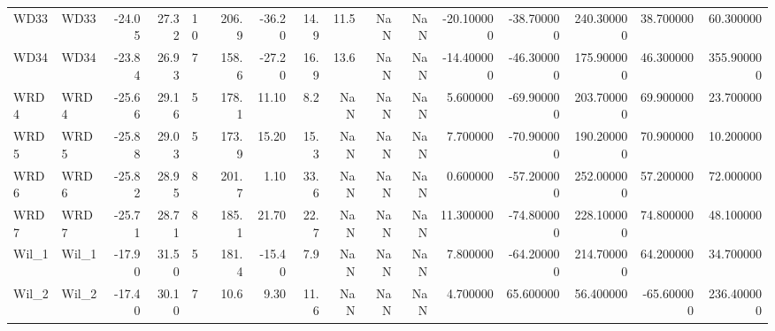 \documentclass{article}
\begin{document}
{\begin{tabular}{llrrlrrrrrrrrrrr}
WD33          &                     WD33 &    -24.05 &      27.32 &   10 &   206.9 &  -36.20 &  14.9 &   11.5 &     NaN &         NaN &     -20.100000 & -38.700000 &  240.300000 &     38.700000 &      60.300000 \\
WD34          &                     WD34 &    -23.84 &      26.93 &    7 &   158.6 &  -27.20 &  16.9 &   13.6 &     NaN &         NaN &     -14.400000 & -46.300000 &  175.900000 &     46.300000 &     355.900000 \\
WRD4          &                     WRD4 &    -25.66 &      29.16 &    5 &   178.1 &   11.10 &   8.2 &    NaN &     NaN &         NaN &       5.600000 & -69.900000 &  203.700000 &     69.900000 &      23.700000 \\
WRD5          &                     WRD5 &    -25.88 &      29.03 &    5 &   173.9 &   15.20 &  15.3 &    NaN &     NaN &         NaN &       7.700000 & -70.900000 &  190.200000 &     70.900000 &      10.200000 \\
WRD6          &                     WRD6 &    -25.82 &      28.95 &    8 &   201.7 &    1.10 &  33.6 &    NaN &     NaN &         NaN &       0.600000 & -57.200000 &  252.000000 &     57.200000 &      72.000000 \\
WRD7          &                     WRD7 &    -25.71 &      28.71 &    8 &   185.1 &   21.70 &  22.7 &    NaN &     NaN &         NaN &      11.300000 & -74.800000 &  228.100000 &     74.800000 &      48.100000 \\
Wil\_1         &                    Wil\_1 &    -17.90 &      31.50 &    5 &   181.4 &  -15.40 &   7.9 &    NaN &     NaN &         NaN &       7.800000 & -64.200000 &  214.700000 &     64.200000 &      34.700000 \\
Wil\_2         &                    Wil\_2 &    -17.40 &      30.10 &    7 &    10.6 &    9.30 &  11.6 &    NaN &     NaN &         NaN &       4.700000 &  65.600000 &   56.400000 &    -65.600000 &     236.400000 \\
\bottomrule
\end{tabular}
}

    
\end{document}
